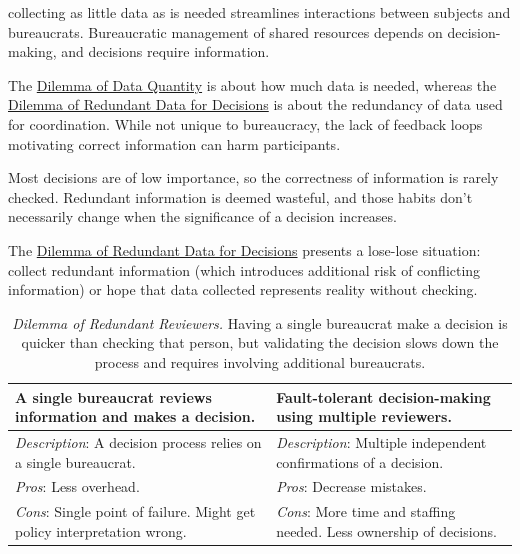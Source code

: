 collecting as little data as is needed streamlines interactions between subjects and bureaucrats. Bureaucratic management of shared resources depends on decision-making, and decisions require information. 


The \hyperref[table:dilemma-personal-gather-data-lots-vs-little]{Dilemma of Data Quantity} is about how much data is needed, whereas the \hyperref[table:dilemma-personal-single-bit-decision]{Dilemma of Redundant Data for Decisions} is about the redundancy of data used for coordination. While not unique to bureaucracy, the lack of feedback loops motivating correct information can harm participants.

Most decisions are of low importance, so the correctness of information is rarely checked. Redundant information is deemed wasteful, and those habits don't necessarily change when the significance of a decision increases. 

The \hyperref[table:dilemma-personal-single-bit-decision]{Dilemma of Redundant Data for Decisions} presents a lose-lose situation: collect redundant information (which introduces additional risk of conflicting information) or hope that data collected represents reality without checking. 


\begin{center}
\begin{table}[H] %
\begin{tabular}{ | m{\dilemmatablewidth}| m{\dilemmatablewidth} | } 
  \hline
  \textbf{A single bureaucrat reviews information and makes a decision.} & 
  \textbf{Fault-tolerant decision-making using multiple reviewers.} \\ 
  \hline
  \textit{Description}: A decision process relies on a single bureaucrat. & 
  \textit{Description}: Multiple independent confirmations of a decision.  \\
  \hline
  \textit{Pros}: Less overhead. & 
  \textit{Pros}: Decrease mistakes. \\
  \hline
  \textit{Cons}: Single point of failure. Might get policy interpretation wrong. &
  \textit{Cons}: More time and staffing needed. Less ownership of decisions. \\  
  \hline
\end{tabular}
\caption{
\textit{Dilemma of Redundant Reviewers.}
Having a single bureaucrat make a decision is quicker than checking that person, but validating the decision slows down the process and requires involving additional bureaucrats.
}
\label{table:dilemma-personal-redundant-reviewers}
\end{table}
\end{center}

